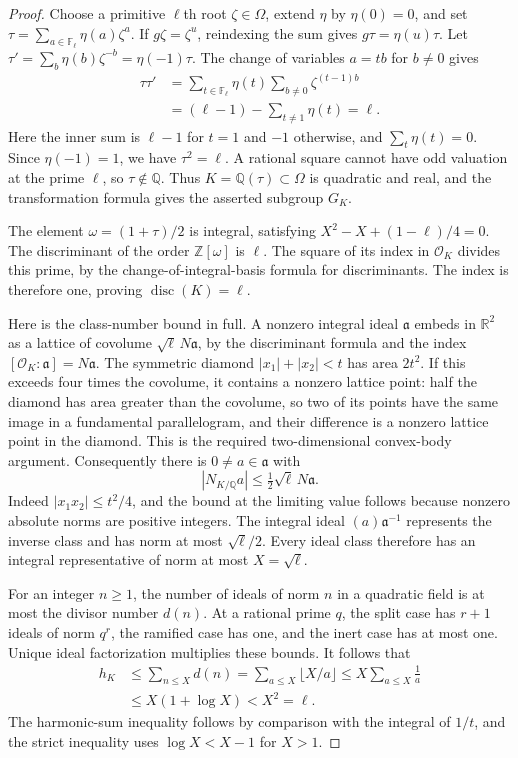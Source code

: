 \begin{proof}
Choose a primitive $\ell$th root $\zeta\in\Omega$, extend
$\eta$ by $\eta(0)=0$, and set
$\tau=\sum_{a\in\mathbb F_\ell}\eta(a)\zeta^a$.
If $g\zeta=\zeta^u$, reindexing the sum gives
$g\tau=\eta(u)\tau$.  Let
$\tau'=\sum_b\eta(b)\zeta^{-b}=\eta(-1)\tau$.
The change of variables $a=tb$ for $b\ne0$ gives
\[
 \begin{split}
 \tau\tau'
 &=\sum_{t\in\mathbb F_\ell}\eta(t)
                  \sum_{b\ne0}\zeta^{(t-1)b}\\
 &=(\ell-1)-\sum_{t\ne1}\eta(t)=\ell.
 \end{split}
 \tag{CZ.6}
\]
Here the inner sum is $\ell-1$ for $t=1$ and $-1$ otherwise,
and $\sum_t\eta(t)=0$.  Since $\eta(-1)=1$, we have
$\tau^2=\ell$.  A rational square cannot have odd valuation at
the prime $\ell$, so $\tau\notin\mathbb Q$.  Thus
$K=\mathbb Q(\tau)\subset\Omega$ is quadratic and real, and
the transformation formula gives the asserted subgroup $G_K$.

The element $\omega=(1+\tau)/2$ is integral, satisfying
$X^2-X+(1-\ell)/4=0$.  The discriminant of the order
$\mathbb Z[\omega]$ is $\ell$.  The square of its index in
$\mathcal O_K$ divides this prime, by the change-of-integral-basis
formula for discriminants.  The index is therefore one, proving
$\operatorname{disc}(K)=\ell$.

Here is the class-number bound in full.  A nonzero integral ideal
$\mathfrak a$ embeds in $\mathbb R^2$ as a lattice of covolume
$\sqrt\ell\,N\mathfrak a$, by the discriminant formula and
the index $[\mathcal O_K:\mathfrak a]=N\mathfrak a$.
The symmetric diamond $|x_1|+|x_2|<t$ has area $2t^2$.
If this exceeds four times the covolume, it contains a nonzero
lattice point: half the diamond has area greater than the
covolume, so two of its points have the same image in a
fundamental parallelogram, and their difference is a nonzero
lattice point in the diamond.  This is the required
two-dimensional convex-body argument.  Consequently there is
$0\ne a\in\mathfrak a$ with
\[
 |N_{K/\mathbb Q}a|\le\tfrac12\sqrt\ell\,N\mathfrak a.
 \tag{CZ.7}
\]
Indeed $|x_1x_2|\le t^2/4$, and the bound at the limiting
value follows because nonzero absolute norms are positive integers.
The integral ideal $(a)\mathfrak a^{-1}$ represents the inverse
class and has norm at most $\sqrt\ell/2$.  Every ideal class
therefore has an integral representative of norm at most
$X=\sqrt\ell$.

For an integer $n\ge1$, the number of ideals of norm $n$ in a
quadratic field is at most the divisor number $d(n)$.
At a rational prime $q$, the split case has $r+1$ ideals of norm
$q^r$, the ramified case has one, and the inert case has at most
one.  Unique ideal factorization multiplies these bounds.
It follows that
\[
 \begin{split}
 h_K&\le\sum_{n\le X}d(n)
     =\sum_{a\le X}\lfloor X/a\rfloor
     \le X\sum_{a\le X}\frac1a\\
    &\le X(1+\log X)<X^2=\ell.
 \end{split}
 \tag{CZ.8}
\]
The harmonic-sum inequality follows by comparison with the integral
of $1/t$, and the strict inequality uses $\log X<X-1$ for
$X>1$.


\end{proof}
